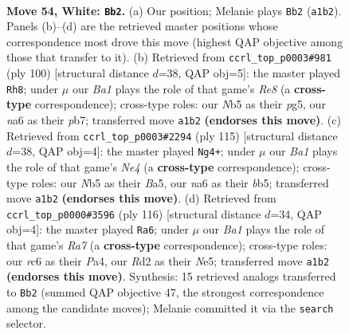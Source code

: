 \documentclass[11pt]{article}
\begin{document}
\clearpage

\begin{figure}[p]\centering
\begin{subfigure}{0.46\textwidth}\centering
\resizebox{\linewidth}{!}{%
\newchessgame
\chessboard[
  setfen={6k1/4p3/npr3pp/pN6/P1p2K2/2P2P2/3R4/B7 w - - 2 54},
  showmover=false,
  pgfstyle=straightmove, color=movearrow, markmove={a1-b2}
]}
\caption{}
\end{subfigure}\hfill
\begin{subfigure}{0.46\textwidth}\centering
\resizebox{\linewidth}{!}{%
\newchessgame
\chessboard[
  setfen={4R3/pp6/3k3p/P2p2pP/3r1pP1/8/5PK1/8 w - - 0 51},
  showmover=false,
  pgfstyle=straightmove, color=movearrow, markmove={e8-h8}
]}
\caption{}
\end{subfigure}
\\[4pt]
\begin{subfigure}{0.46\textwidth}\centering
\resizebox{\linewidth}{!}{%
\newchessgame
\chessboard[
  setfen={2R5/p4pk1/P7/bBP1nP1p/4N2P/4K3/8/3r4 b - - 2 58},
  showmover=false,
  pgfstyle=straightmove, color=movearrow, markmove={e5-g4}
]}
\caption{}
\end{subfigure}\hfill
\begin{subfigure}{0.46\textwidth}\centering
\resizebox{\linewidth}{!}{%
\newchessgame
\chessboard[
  setfen={6k1/R7/1p3r1p/4Nbp1/P2P1p2/5P1P/4K3/8 w - - 1 59},
  showmover=false,
  pgfstyle=straightmove, color=movearrow, markmove={a7-a6}
]}
\caption{}
\end{subfigure}
\caption{\textbf{Move 54, White: \texttt{Bb2}.} (a) Our position; Melanie plays \texttt{Bb2} (\texttt{a1b2}). Panels (b)--(d) are the retrieved master positions whose correspondence most drove this move (highest QAP objective among those that transfer to it). (b) Retrieved from \texttt{ccrl\_top\_p0003\#981} (ply 100) [structural distance $d$=38, QAP obj=5]: the master played \texttt{Rh8}; under $\mu$ our \emph{Ba1} plays the role of that game's \emph{Re8} (a \textbf{cross-type} correspondence); cross-type roles: our \emph{N}b5 as their \emph{p}g5, our \emph{n}a6 as their \emph{p}b7; transferred move \texttt{a1b2} \textbf{(endorses this move)}. (c) Retrieved from \texttt{ccrl\_top\_p0003\#2294} (ply 115) [structural distance $d$=38, QAP obj=4]: the master played \texttt{Ng4+}; under $\mu$ our \emph{Ba1} plays the role of that game's \emph{Ne4} (a \textbf{cross-type} correspondence); cross-type roles: our \emph{N}b5 as their \emph{B}a5, our \emph{n}a6 as their \emph{b}b5; transferred move \texttt{a1b2} \textbf{(endorses this move)}. (d) Retrieved from \texttt{ccrl\_top\_p0000\#3596} (ply 116) [structural distance $d$=34, QAP obj=4]: the master played \texttt{Ra6}; under $\mu$ our \emph{Ba1} plays the role of that game's \emph{Ra7} (a \textbf{cross-type} correspondence); cross-type roles: our \emph{r}c6 as their \emph{P}a4, our \emph{R}d2 as their \emph{N}e5; transferred move \texttt{a1b2} \textbf{(endorses this move)}. Synthesis: 15 retrieved analogs transferred to \texttt{Bb2} (summed QAP objective 47, the strongest correspondence among the candidate moves); Melanie committed it via the \texttt{search} selector.}
\label{fig:thought-m106}
\end{figure}
\end{document}

